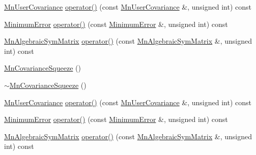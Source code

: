 \begin{DoxyCompactItemize}
\item 
\mbox{\hyperlink{classROOT_1_1Minuit2_1_1MnUserCovariance}{Mn\+User\+Covariance}} \mbox{\hyperlink{classROOT_1_1Minuit2_1_1MnCovarianceSqueeze_af75da2b8e6e20a5477a6b0ceac4efb3a}{operator()}} (const \mbox{\hyperlink{classROOT_1_1Minuit2_1_1MnUserCovariance}{Mn\+User\+Covariance}} \&, unsigned int) const
\item 
\mbox{\hyperlink{classROOT_1_1Minuit2_1_1MinimumError}{Minimum\+Error}} \mbox{\hyperlink{classROOT_1_1Minuit2_1_1MnCovarianceSqueeze_a6f1ea9726d0981faacf7ee0c26326bcd}{operator()}} (const \mbox{\hyperlink{classROOT_1_1Minuit2_1_1MinimumError}{Minimum\+Error}} \&, unsigned int) const
\item 
\mbox{\hyperlink{namespaceROOT_1_1Minuit2_a9e74ad97f5537a2e80e52b04d98ecc6e}{Mn\+Algebraic\+Sym\+Matrix}} \mbox{\hyperlink{classROOT_1_1Minuit2_1_1MnCovarianceSqueeze_a3271676361fc2c88dad2037f40479fab}{operator()}} (const \mbox{\hyperlink{namespaceROOT_1_1Minuit2_a9e74ad97f5537a2e80e52b04d98ecc6e}{Mn\+Algebraic\+Sym\+Matrix}} \&, unsigned int) const
\item 
\mbox{\hyperlink{classROOT_1_1Minuit2_1_1MnCovarianceSqueeze_a865c0aed477be8c5177745181d4cf200}{Mn\+Covariance\+Squeeze}} ()
\item 
\mbox{\hyperlink{classROOT_1_1Minuit2_1_1MnCovarianceSqueeze_a15e84b50e1ac75701a986f62e74d77d6}{$\sim$\+Mn\+Covariance\+Squeeze}} ()
\item 
\mbox{\hyperlink{classROOT_1_1Minuit2_1_1MnUserCovariance}{Mn\+User\+Covariance}} \mbox{\hyperlink{classROOT_1_1Minuit2_1_1MnCovarianceSqueeze_af75da2b8e6e20a5477a6b0ceac4efb3a}{operator()}} (const \mbox{\hyperlink{classROOT_1_1Minuit2_1_1MnUserCovariance}{Mn\+User\+Covariance}} \&, unsigned int) const
\item 
\mbox{\hyperlink{classROOT_1_1Minuit2_1_1MinimumError}{Minimum\+Error}} \mbox{\hyperlink{classROOT_1_1Minuit2_1_1MnCovarianceSqueeze_a6f1ea9726d0981faacf7ee0c26326bcd}{operator()}} (const \mbox{\hyperlink{classROOT_1_1Minuit2_1_1MinimumError}{Minimum\+Error}} \&, unsigned int) const
\item 
\mbox{\hyperlink{namespaceROOT_1_1Minuit2_a9e74ad97f5537a2e80e52b04d98ecc6e}{Mn\+Algebraic\+Sym\+Matrix}} \mbox{\hyperlink{classROOT_1_1Minuit2_1_1MnCovarianceSqueeze_a3271676361fc2c88dad2037f40479fab}{operator()}} (const \mbox{\hyperlink{namespaceROOT_1_1Minuit2_a9e74ad97f5537a2e80e52b04d98ecc6e}{Mn\+Algebraic\+Sym\+Matrix}} \&, unsigned int) const
\end{DoxyCompactItemize}


